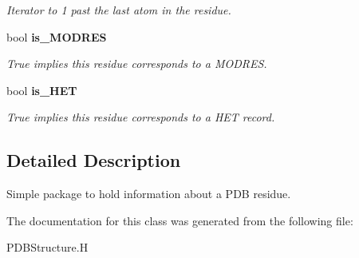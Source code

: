\begin{CompactItemize}
\begin{CompactList}\small\item\em Iterator to 1 past the last atom in the residue. \item\end{CompactList}\item 
bool \bf{is\_\-MODRES}\label{classSimSite3D_1_1residue__t_d37b0dfb9a32c77e2ae2c167008d39a3}

\begin{CompactList}\small\item\em True implies this residue corresponds to a MODRES. \item\end{CompactList}\item 
bool \bf{is\_\-HET}\label{classSimSite3D_1_1residue__t_78e29c2b3e395dae09614d59d45309d4}

\begin{CompactList}\small\item\em True implies this residue corresponds to a HET record. \item\end{CompactList}\end{CompactItemize}


\subsection{Detailed Description}
Simple package to hold information about a PDB residue. 



The documentation for this class was generated from the following file:\begin{CompactItemize}
\item 
PDBStructure.H\end{CompactItemize}

